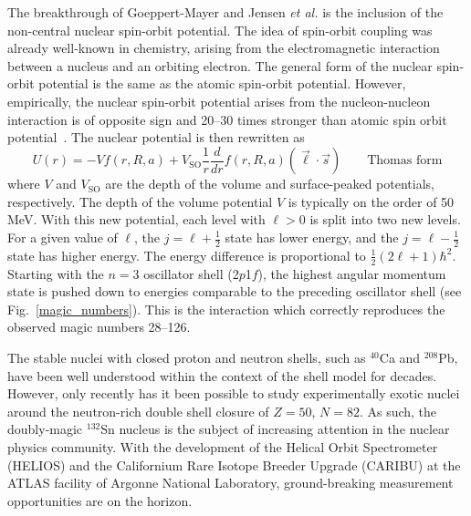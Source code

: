 The breakthrough of Goeppert-Mayer and Jensen \textit{et al.} is the inclusion of the non-central nuclear spin-orbit potential.  %
The idea of spin-orbit coupling was already well-known in chemistry, arising from the electromagnetic interaction between a nucleus and an orbiting electron.
  The general form of the nuclear spin-orbit potential is the same as the atomic spin-orbit potential.  However, empirically, the nuclear spin-orbit potential arises from the nucleon-nucleon interaction is of opposite sign and 20--30 times stronger than atomic spin orbit potential~\cite{Krane_1988,Satchler_1990}.  The nuclear potential is then rewritten as 
\begin{equation}
U(r)=-V f(r,R,a)+V_\mathrm{SO} \frac{1}{r} \frac{d}{dr} f(r,R,a) (\vec{\ell}\cdot\vec{s}) 
\qquad \textrm{Thomas form}
\label{eq:optical}
\end{equation}
where $V$ and $V_\mathrm{SO}$ are the depth of the volume and surface-peaked potentials, respectively. 
 The depth of the volume potential $V$ is typically on the order of 50\,MeV.  With this new potential, each level with $\ell>0$ is split into two new levels.  For a given value of $\ell$, the $j=\ell+\frac{1}{2}$ state has lower energy, and the $j=\ell-\frac{1}{2}$ state has higher energy.  The energy difference is proportional to $\frac{1}{2}(2\ell+1)\hbar^2$.  Starting with the $n=3$ oscillator shell (2$p$1$f$), the highest angular momentum state is pushed down to energies comparable to the preceding oscillator shell (see Fig.~\ref{magic_numbers}). This is the interaction which correctly reproduces the observed magic numbers 28--126.

The stable nuclei with closed proton and neutron shells, such as $^{40}$Ca and $^{208}$Pb, have been well understood within the context of the shell model for decades.  However, only recently has it been possible to study experimentally  exotic nuclei around the neutron-rich double shell closure of $Z=50$, $N=82$.  As such, the doubly-magic $^{132}$Sn nucleus is the subject of increasing attention in the nuclear physics community.  With the development of the Helical Orbit Spectrometer (HELIOS) and the Californium Rare Isotope Breeder Upgrade (CARIBU) at the ATLAS facility of Argonne National Laboratory, ground-breaking measurement opportunities are on the horizon.

